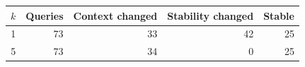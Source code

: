 \begin{tabular}{rrrrr}
\toprule
$k$ & Queries & Context changed & Stability changed & Stable \\
\midrule
1 & 73 & 33 & 42 & 25 \\
5 & 73 & 34 & 0 & 25 \\
\bottomrule
\end{tabular}

